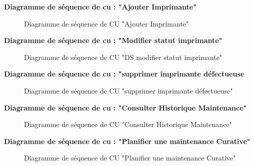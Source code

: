 \documentclass[a4paper,11pt]{report}
\begin{document}
\textbf{Diagramme de séquence de cu : "Ajouter Imprimante" }


\begin{figure}[H]
  \centering
  \setlength{\fboxrule}{1pt}
  \setlength{\fboxsep}{3pt}
  \caption{Diagramme de séquence de CU "Ajouter Imprimante"}
  \label{fig:clone-result}
\end{figure}

\textbf{Diagramme de séquence de cu : "Modifier statut imprimante" }


\begin{figure}[H]
  \centering
  \setlength{\fboxrule}{1pt}
  \setlength{\fboxsep}{3pt}
  \caption{Diagramme de séquence de CU "DS modifier statut imprimante"}
  \label{fig:clone-result}
\end{figure}





\textbf{Diagramme de séquence de cu : "supprimer imprimante défectueuse }
\begin{figure}[H]
  \centering
  \setlength{\fboxrule}{1pt}
  \setlength{\fboxsep}{3pt}
  \caption{Diagramme de séquence de CU "supprimer imprimante défectueuse"}
  \label{fig:clone-result}
\end{figure}




\textbf{Diagramme de séquence de cu : "Consulter Historique Maintenance" }
\begin{figure}[H]
  \centering
  \setlength{\fboxrule}{1pt}
  \setlength{\fboxsep}{3pt}
  \caption{Diagramme de séquence de CU "Consulter Historique Maintenance"}
  \label{fig:clone-result}
\end{figure}


\textbf{Diagramme de séquence de cu : "Planifier une maintenance Curative" }
\begin{figure}[H]
  \centering
  \setlength{\fboxrule}{1pt}
  \setlength{\fboxsep}{3pt}
  \caption{Diagramme de séquence de CU "Planifier une maintenance Curative"}
  \label{fig:clone-result}
\end{figure}
\end{document}
